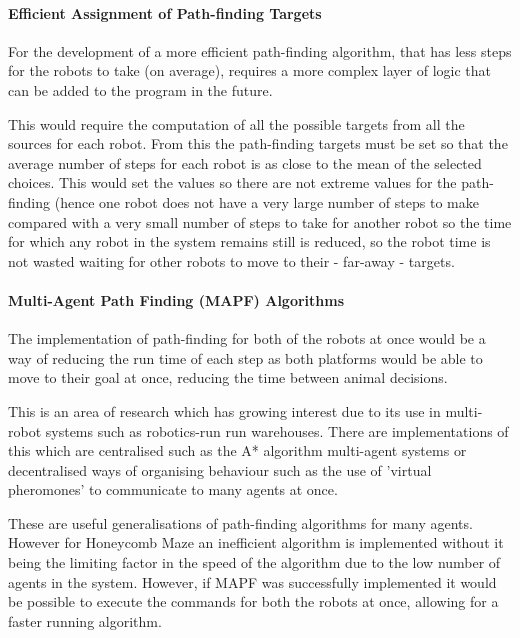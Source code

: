 \paragraph{Efficient Assignment of Path-finding Targets}

For the development of a more efficient path-finding algorithm, that has less steps for the robots to take (on average), requires a more complex layer of logic that can be added to the program in the future.

This would require the computation of all the possible targets from all the sources for each robot. From this the path-finding targets must be set so that the average number of steps for each robot is as close to the mean of the selected choices. This would set the values so there are not extreme values for the path-finding (hence one robot does not have a very large number of steps to make compared with a very small number of steps to take for another robot so the time for which any robot in the system remains still is reduced, so the robot time is not wasted waiting for other robots to move to their - far-away - targets.

\paragraph{Multi-Agent Path Finding (MAPF) Algorithms } 

The implementation of path-finding for both of the robots at once would be a way of reducing the run time of each step as both platforms would be able to move to their goal at once, reducing the time between animal decisions.

This is an area of research which has growing interest due to its use in multi-robot systems such as robotics-run run warehouses. There are implementations of this which are centralised such as the A* algorithm multi-agent systems \cite{DBLP:journals/corr/abs-2103-09979} or decentralised ways of organising behaviour such as the use of 'virtual pheromones' \cite{multi_agent_pathfinding_review} to communicate to many agents at once. 


These are useful generalisations of path-finding algorithms for many agents. However for Honeycomb Maze an inefficient algorithm is implemented without it being the limiting factor in the speed of the algorithm due to the low number of agents in the system.
However, if MAPF was successfully implemented it would be possible to execute the commands for both the robots at once, allowing for a faster running algorithm.











